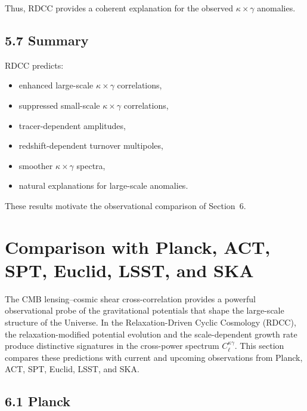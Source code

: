 \documentclass[11pt,a4paper]{article}
\begin{document}
Thus, RDCC provides a coherent explanation for the observed $\kappa \times \gamma$ anomalies.

\subsection*{5.7 Summary}

RDCC predicts:

\begin{itemize}
    \item enhanced large-scale $\kappa \times \gamma$ correlations,
    \item suppressed small-scale $\kappa \times \gamma$ correlations,
    \item tracer-dependent amplitudes,
    \item redshift-dependent turnover multipoles,
    \item smoother $\kappa \times \gamma$ spectra,
    \item natural explanations for large-scale anomalies.
\end{itemize}

These results motivate the observational comparison of Section~6.

\section{Comparison with Planck, ACT, SPT, Euclid, LSST, and SKA}

The CMB lensing--cosmic shear cross-correlation provides a powerful observational probe of 
the gravitational potentials that shape the large-scale structure of the Universe. In the 
Relaxation-Driven Cyclic Cosmology (RDCC), the relaxation-modified potential evolution and 
the scale-dependent growth rate produce distinctive signatures in the cross-power spectrum 
$C_{\ell}^{\kappa\gamma}$. This section compares these predictions with current and upcoming 
observations from Planck, ACT, SPT, Euclid, LSST, and SKA.

\subsection*{6.1 Planck}
\end{document}
